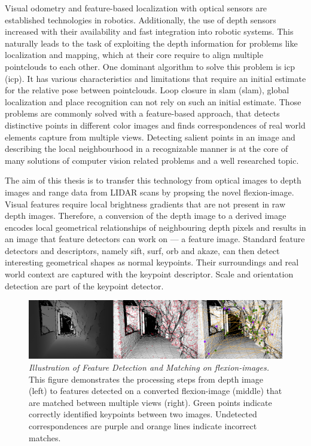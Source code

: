 Visual odometry\cite{he_tvc2019} and \gls{feature}-based localization with optical sensors\cite{sattler_cvpr2018} are established technologies in robotics.
Additionally, the use of depth sensors increased with their availability and fast integration into robotic systems.
This naturally leads to the task of exploiting the depth information for problems like localization and mapping, which at their core require to align multiple pointclouds to each other.
One dominant algorithm to solve this problem is \acrshort{icp} (\acrlong{icp})\cite{besl_pami1992}.
It has various characteristics and limitations that require an initial estimate for the relative pose between pointclouds\cite{rusinkiewicz_ieee2001}.
Loop closure in \acrshort{slam} (\acrlong{slam})\cite{ho_ros2006}, global localization and place recognition\cite{sattler_2011} can not rely on such an initial estimate.
Those problems are commonly solved with a \gls{feature}-based approach, that detects distinctive points in different color images and finds correspondences of real world elements capture from multiple views.
Detecting salient points in an image and describing the local neighbourhood in a recognizable manner is at the core of many solutions of computer vision related problems and a well researched topic\cite{andersson_2016}.

The aim of this thesis is to transfer this technology from optical images to depth images and range data from \acrshort{LIDAR} scans by propsing the novel \Gls{flexion-image}.
Visual features require local brightness gradients that are not present in raw depth images.
Therefore, a conversion of the depth image to a derived image encodes local geometrical relationships of neighbouring depth pixels and results in an image that feature detectors can work on --- a feature image.
Standard feature detectors and descriptors, namely \acrshort{sift}, \acrshort{surf}, \acrshort{orb} and \acrshort{akaze}, can then detect interesting geometrical shapes as normal keypoints.
Their surroundings and real world context are captured with the keypoint descriptor.
Scale and orientation detection are part of the keypoint detector.
\begin{figure}[htb]
    \includegraphics[width=\linewidth]{chapter01/masterarbeit_method.png}
    \caption[Illustration of Feature Detection and Matching on \Glspl{flexion-image}]{\emph{Illustration of Feature Detection and Matching on \Glspl{flexion-image}.} This figure demonstrates the processing steps from depth image (left) to features detected on a converted \gls{flexion-image} (middle) that are matched between multiple views (right). Green points indicate correctly identified keypoints between two images. Undetected correspondences are purple and orange lines indicate incorrect matches.}\label{fig:method_example}
\end{figure}

